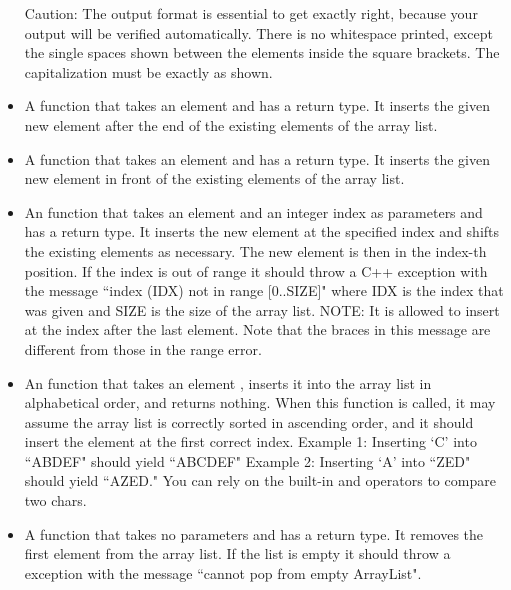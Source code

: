 \documentclass[11pt]{report}
\begin{document}
\begin{itemize}
      Caution:  The output format is essential to get exactly right,
      because your output will be verified automatically.  There is no
      whitespace printed, except the single spaces shown between the
      elements inside the square brackets.  The capitalization must be
      exactly as shown.

    \item A  function that takes an element  and has a
       return type.  It inserts the given new element after the end
      of the existing elements of the array list.

    \item A  function that takes an element  and has a
       return type.  It inserts the given new element in front of
      the existing elements of the array list.

    \item An  function that takes an element  and an integer
      index as parameters and has a  return type.  It inserts the
      new element at the specified index and shifts the existing
      elements as necessary.  The new element is then in the index-th
      position.  If the index is out of range it should throw a C++
       exception with the message ``index (IDX) not in range
      [0..SIZE]" where IDX is the index that was given and SIZE is the
      size of the array list.
      NOTE:  It is allowed to insert at the index after the last element.
      Note that the braces in this message are different from those in
      the  range error.
      
    \item An  function that takes an element , inserts
      it into the array list in alphabetical order, and returns nothing.
      When this function is called, it may assume the array list is
      correctly sorted in ascending order, and it should insert the
      element at the first correct index.
      Example 1: Inserting `C' into ``ABDEF" should yield ``ABCDEF"
      Example 2: Inserting `A' into ``ZED" should yield ``AZED."  You can
      rely on the built-in \code{<, >, <=, >=,} and \code{==} operators to compare two
      chars.

    \item A  function that takes no parameters and has a 
      return type.  It removes the first element from the array list.
      If the list is empty it should throw a 
      exception with the message ``cannot pop from empty ArrayList".


\end{itemize}
\end{document}
